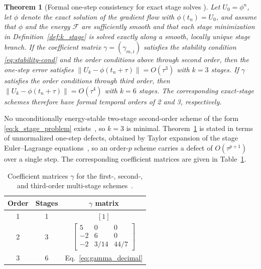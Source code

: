\documentclass[11pt,letterpaper]{article}
\theoremstyle{plain}
\newtheorem{theorem}{Theorem}[section]
\theoremstyle{definition}
\newcommand{\phn}{\phi^n}
\newcommand{\norm}[1]{\left\| #1 \right\|}
\newcommand{\E}{\mathcal{F}}
\begin{document}
\begin{theorem}[Formal one-step consistency for exact stage solves {\cite[Proposition~3.1 and \S 4]{Zaitzeff2020}}]
\label{thm:high_order}
Let $U_0=\phn$, let $\phi$ denote the exact solution of the gradient flow with $\phi(t_n)=U_0$, and assume that $\phi$ and the energy $\E$ are sufficiently smooth and that each stage minimization in Definition~\ref{def:k_stage} is solved exactly along a smooth, locally unique stage branch. If the coefficient matrix $\gamma=(\gamma_{m, i})$ satisfies the stability condition \eqref{eq:stability-cond} and the order conditions above through second order, then the one-step error satisfies $\norm{U_k-\phi(t_n+\tau)}=O(\tau^{3})$ with $k=3$ stages. If $\gamma$ satisfies the order conditions through third order, then $\norm{U_k-\phi(t_n+\tau)}=O(\tau^{4})$ with $k=6$ stages. The corresponding exact-stage schemes therefore have formal temporal orders of 2 and 3, respectively.
\end{theorem}

No unconditionally energy-stable two-stage second-order scheme of the form \eqref{eq:k_stage_problem} exists~\cite{Zaitzeff2020}, so $k=3$ is minimal. Theorem~\ref{thm:high_order} is stated in terms of unnormalized one-step defects, obtained by Taylor expansion of the stage Euler--Lagrange equations~\cite{Zaitzeff2020}, so an order-$p$ scheme carries a defect of $O(\tau^{p+1})$ over a single step. The corresponding coefficient matrices are given in Table~\ref{tab:high_order_coefficients}.

\begin{table}[H]
\centering
\caption{Coefficient matrices $\gamma$ for the first-, second-, and third-order multi-stage schemes~\cite{Zaitzeff2020}.}
\label{tab:high_order_coefficients}
\begin{tabular}{ccc}
\toprule
Order & Stages & $\gamma$ matrix \\
\midrule
1 & 1 & $[1]$ \\
2 & 3 & $\begin{bmatrix} 5 & 0 & 0 \\ -2 & 6 & 0 \\ -2 & 3/14 & 44/7 \end{bmatrix}$ \\
3 & 6 & Eq.~\eqref{eq:gamma_decimal} \\
\bottomrule
\end{tabular}
\end{table}
\end{document}

